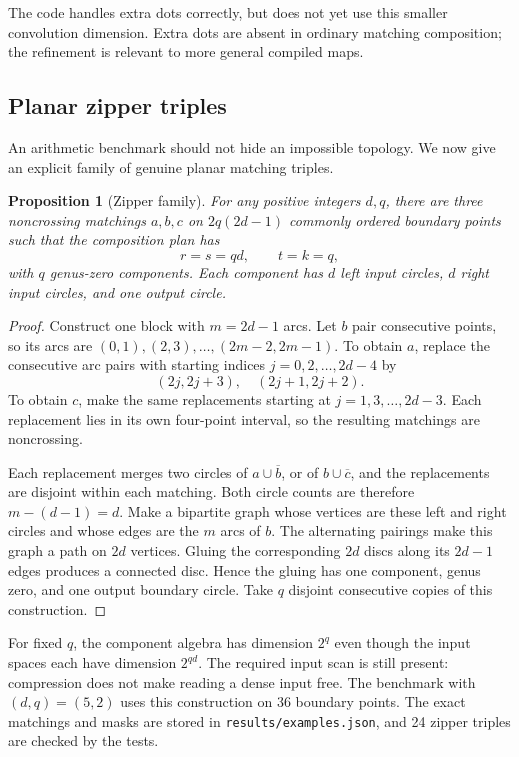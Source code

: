 \documentclass[11pt,letterpaper]{article}
\newtheorem{proposition}[theorem]{Proposition}
\theoremstyle{definition}
\theoremstyle{remark}
\begin{document}
The code handles extra dots correctly, but does not yet use this smaller
convolution dimension. Extra dots are absent in ordinary matching
composition; the refinement is relevant to more general compiled maps.

\subsection{Planar zipper triples}
An arithmetic benchmark should not hide an impossible topology. We now
give an explicit family of genuine planar matching triples.

\begin{proposition}[Zipper family]
\label{prop:zipper}
For any positive integers $d,q$, there are three noncrossing matchings
$a,b,c$ on $2q(2d-1)$ commonly ordered boundary points such that the
composition plan has
\[
 r=s=qd,\qquad t=k=q,
\]
with $q$ genus-zero components. Each component has $d$ left input circles,
$d$ right input circles, and one output circle.
\end{proposition}
\begin{proof}
Construct one block with $m=2d-1$ arcs. Let $b$ pair consecutive points,
so its arcs are $(0,1),(2,3),\ldots,(2m-2,2m-1)$.
To obtain $a$, replace the consecutive arc pairs with starting indices
$j=0,2,\ldots,2d-4$ by
\[
 (2j,2j+3),\quad(2j+1,2j+2).
\]
To obtain $c$, make the same replacements starting at
$j=1,3,\ldots,2d-3$. Each replacement lies in its own four-point interval,
so the resulting matchings are noncrossing.

Each replacement merges two circles of $a\cup\overline b$, or of
$b\cup\overline c$, and the replacements are disjoint within each
matching. Both circle counts are therefore $m-(d-1)=d$.
Make a bipartite graph whose vertices are these left and right circles
and whose edges are the $m$ arcs of $b$. The alternating pairings make
this graph a path on $2d$ vertices. Gluing the corresponding $2d$ discs
along its $2d-1$ edges produces a connected disc. Hence the gluing has one
component, genus zero, and one output boundary circle.
Take $q$ disjoint consecutive copies of this construction.
\end{proof}

For fixed $q$, the component algebra has dimension $2^q$ even though the
input spaces each have dimension $2^{qd}$. The required input scan is still
present: compression does not make reading a dense input free. The
benchmark with $(d,q)=(5,2)$ uses this construction on 36 boundary points.
The exact matchings and masks are stored in \texttt{results/examples.json},
and 24 zipper triples are checked by the tests.
\end{document}
